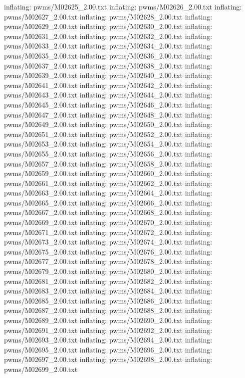 \documentclass[letterpaper,10pt,english]{sphinxmanual}
\begin{document}
{\begin{sphinxVerbatim}[commandchars=\\\{\}]
  inflating: pwms/M02625\_2.00.txt
  inflating: pwms/M02626\_2.00.txt
  inflating: pwms/M02627\_2.00.txt
  inflating: pwms/M02628\_2.00.txt
  inflating: pwms/M02629\_2.00.txt
  inflating: pwms/M02630\_2.00.txt
  inflating: pwms/M02631\_2.00.txt
  inflating: pwms/M02632\_2.00.txt
  inflating: pwms/M02633\_2.00.txt
  inflating: pwms/M02634\_2.00.txt
  inflating: pwms/M02635\_2.00.txt
  inflating: pwms/M02636\_2.00.txt
  inflating: pwms/M02637\_2.00.txt
  inflating: pwms/M02638\_2.00.txt
  inflating: pwms/M02639\_2.00.txt
  inflating: pwms/M02640\_2.00.txt
  inflating: pwms/M02641\_2.00.txt
  inflating: pwms/M02642\_2.00.txt
  inflating: pwms/M02643\_2.00.txt
  inflating: pwms/M02644\_2.00.txt
  inflating: pwms/M02645\_2.00.txt
  inflating: pwms/M02646\_2.00.txt
  inflating: pwms/M02647\_2.00.txt
  inflating: pwms/M02648\_2.00.txt
  inflating: pwms/M02649\_2.00.txt
  inflating: pwms/M02650\_2.00.txt
  inflating: pwms/M02651\_2.00.txt
  inflating: pwms/M02652\_2.00.txt
  inflating: pwms/M02653\_2.00.txt
  inflating: pwms/M02654\_2.00.txt
  inflating: pwms/M02655\_2.00.txt
  inflating: pwms/M02656\_2.00.txt
  inflating: pwms/M02657\_2.00.txt
  inflating: pwms/M02658\_2.00.txt
  inflating: pwms/M02659\_2.00.txt
  inflating: pwms/M02660\_2.00.txt
  inflating: pwms/M02661\_2.00.txt
  inflating: pwms/M02662\_2.00.txt
  inflating: pwms/M02663\_2.00.txt
  inflating: pwms/M02664\_2.00.txt
  inflating: pwms/M02665\_2.00.txt
  inflating: pwms/M02666\_2.00.txt
  inflating: pwms/M02667\_2.00.txt
  inflating: pwms/M02668\_2.00.txt
  inflating: pwms/M02669\_2.00.txt
  inflating: pwms/M02670\_2.00.txt
  inflating: pwms/M02671\_2.00.txt
  inflating: pwms/M02672\_2.00.txt
  inflating: pwms/M02673\_2.00.txt
  inflating: pwms/M02674\_2.00.txt
  inflating: pwms/M02675\_2.00.txt
  inflating: pwms/M02676\_2.00.txt
  inflating: pwms/M02677\_2.00.txt
  inflating: pwms/M02678\_2.00.txt
  inflating: pwms/M02679\_2.00.txt
  inflating: pwms/M02680\_2.00.txt
  inflating: pwms/M02681\_2.00.txt
  inflating: pwms/M02682\_2.00.txt
  inflating: pwms/M02683\_2.00.txt
  inflating: pwms/M02684\_2.00.txt
  inflating: pwms/M02685\_2.00.txt
  inflating: pwms/M02686\_2.00.txt
  inflating: pwms/M02687\_2.00.txt
  inflating: pwms/M02688\_2.00.txt
  inflating: pwms/M02689\_2.00.txt
  inflating: pwms/M02690\_2.00.txt
  inflating: pwms/M02691\_2.00.txt
  inflating: pwms/M02692\_2.00.txt
  inflating: pwms/M02693\_2.00.txt
  inflating: pwms/M02694\_2.00.txt
  inflating: pwms/M02695\_2.00.txt
  inflating: pwms/M02696\_2.00.txt
  inflating: pwms/M02697\_2.00.txt
  inflating: pwms/M02698\_2.00.txt
  inflating: pwms/M02699\_2.00.txt

\end{sphinxVerbatim}}
\end{document}
